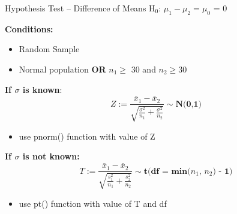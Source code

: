 \documentclass{beamer}
\begin{document}
\begin{frame}{Hypothesis Test -- Difference of Means}
H$_0$: $\mu_1 - \mu_2 = \mu_0$ = 0 \vspace{3mm}

\textbf{Conditions:}
\begin{itemize}
    \item Random Sample
    \item Normal population \textbf{OR} $n_1 \geq$ 30 and $n_2 \geq 30$
\end{itemize} \vspace{3mm}

\textbf{If $\sigma$ is known}:
\begin{equation*}
    Z := \frac{\bar{x}_1-\bar{x}_2}{\sqrt{\frac{\sigma^2}{n_1}+\frac{\sigma^2}{n_2}}} \sim \textbf{N(0,1)}
\end{equation*} \vspace{-4mm}
\begin{itemize}
    \item use pnorm() function with value of Z
\end{itemize} \vspace{2mm}

\textbf{If $\sigma$ is not known:}
\begin{equation*}
    T := \frac{\bar{x}_1-\bar{x}_2}{\sqrt{\frac{s_1^2}{n_1}+\frac{s_2^2}{n_2}}} \sim \textbf{t(df = min($n_1$, $n_2$) - 1)}
\end{equation*} \vspace{-4mm}
\begin{itemize}
    \item use pt() function with value of T and df
\end{itemize}
\end{frame}
\end{document}
